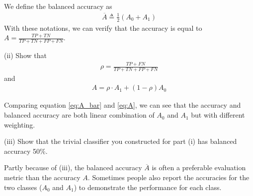 We define the balanced accuracy as 
\begin{align}
\overline{A} \triangleq \frac{1}{2} \left(A_0+A_1\right)
\label{eq:A_bar}
\end{align}
With these notations, we can verify that the accuracy is equal to $
A =\frac{TP+TN}{TP+TN + FP+FN} $. 

(ii)  Show that 
\begin{align*}
\rho = \frac{TP + FN}{TP+TN + FP+FN}
\end{align*}
and 
\begin{align}
A = \rho \cdot A_1 + (1-\rho)A_0
\label{eq:A}
\end{align}


Comparing equation \eqref{eq:A_bar} and \eqref{eq:A}, we can see that the accuracy and balanced accuracy are both linear combination of $A_0$ and $A_1$ but with different weighting. 

(iii)  Show that the trivial classifier you constructed for part (i) has balanced accuracy 50\%. 

Partly because of (iii), the balanced accuracy $\overline{A}$ is often a preferable evaluation metric than the accuracy $A$. Sometimes people also report the accuracies for the two classes ($A_0$ and $A_1$) to demonstrate the performance for each class. 